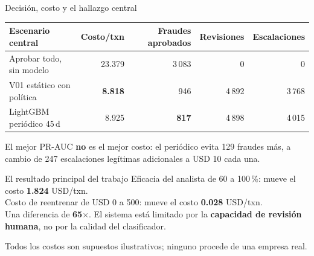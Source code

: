 \documentclass[aspectratio=169,10pt]{beamer}
\begin{document}
\begin{frame}{Decisión, costo y el hallazgo central}\small
\begin{center}
\begin{tabular}{@{}lrrrr@{}}\toprule
Escenario central & Costo/txn & Fraudes aprobados & Revisiones & Escalaciones\\\midrule
Aprobar todo, sin modelo & 23.379 & 3\,083 & 0 & 0\\
V01 estático con política & \textbf{8.818} & 946 & 4\,892 & 3\,768\\
LightGBM periódico 45\,d & 8.925 & \textbf{817} & 4\,898 & 4\,015\\\bottomrule
\end{tabular}
\end{center}
\vspace{2mm}
El mejor PR-AUC \textbf{no} es el mejor costo: el periódico evita 129 fraudes más, a cambio de 247 escalaciones legítimas adicionales a USD 10 cada una.
\vfill
\begin{block}{El resultado principal del trabajo}
Eficacia del analista de 60 a 100\,\%: mueve el costo \textbf{1.824} USD/txn.\\
Costo de reentrenar de USD 0 a 500: mueve el costo \textbf{0.028} USD/txn.\\[2mm]
Una diferencia de \textbf{65$\times$}. El sistema está limitado por la \textbf{capacidad de revisión humana}, no por la calidad del clasificador.
\end{block}
\vspace{1mm}
\footnotesize Todos los costos son supuestos ilustrativos; ninguno procede de una empresa real.
\end{frame}
\end{document}
